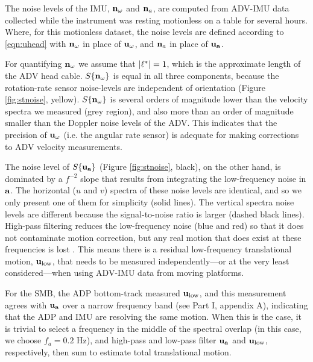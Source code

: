 The noise levels of the IMU, $\mathbf{n}_{\omega}$ and $\mathbf{n}_{a}$, are computed from ADV-IMU data collected while the instrument was resting motionless on a table for several hours. Where, for this motionless dataset, the noise levels are defined according to \eqref{eqn:uhead} with $\mathbf{n}_{\omega}$ in place of $\mathbf{u}_\mathbf{\omega}$, and $\mathbf{n}_{a}$ in place of $\mathbf{u}_\mathbf{a}$.  

For quantifying $\mathbf{n}_{\omega}$ we assume that $|\mathbf{\ell}^*| = 1$, which is the approximate length of the ADV head cable. $S\{\mathbf{n}_{\omega}\}$ is equal in all three components, because the rotation-rate sensor noise-levels are independent of orientation (Figure \ref{fig:stnoise}, yellow). $S\{\mathbf{n}_{\omega}\}$ is several orders of magnitude lower than the velocity spectra we measured (grey region), and also more than an order of magnitude smaller than the Doppler noise levels of the ADV. This indicates that the precision of $\mathbf{u}_\mathbf{\omega}$ (i.e. the angular rate sensor) is adequate for making corrections to ADV velocity measurements.

The noise level of $S\{\mathbf{u}_\mathbf{a}\}$ (Figure \ref{fig:stnoise}, black), on the other hand, is dominated by a $f^{-2}$ slope that results from integrating the low-frequency noise in ${\mathbf{a}}$. The horizontal ($u$ and $v$) spectra of these noise levels are identical, and so we only present one of them for simplicity (solid lines). The vertical spectra noise levels are different because the signal-to-noise ratio is larger (dashed black lines). High-pass filtering reduces the low-frequency noise (blue and red) so that it does not contaminate motion correction, but any real motion that does exist at these frequencies is lost \cite[]{EgelandPhD2014, VanZwieten++2015}. This means there is a residual low-frequency translational motion, $\mathbf{u}_\mathrm{low}$, that needs to be measured independently---or at the very least considered---when using ADV-IMU data from moving platforms. 

For the SMB, the ADP bottom-track measured $\mathbf{u}_\mathrm{low}$, and this measurement agrees with $\mathbf{u}_\mathbf{a}$ over a narrow frequency band (see Part I, appendix A), indicating that the ADP and IMU are resolving the same motion. When this is the case, it is trivial to select a frequency in the middle of the spectral overlap (in this case, we choose $f_a=0.2$ Hz), and high-pass and low-pass filter $\mathbf{u}_\mathbf{a}$ and $\mathbf{u}_\mathrm{low}$, respectively, then sum to estimate total translational motion.


